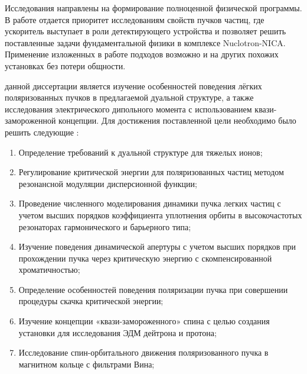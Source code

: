 \par Исследования направлены на формирование полноценной физической программы. В работе отдается приоритет исследованиям свойств пучков частиц, где ускоритель выступает в роли детектирующего устройства и позволяет решить поставленные задачи фундаментальной физики в комплексе Nuclotron-NICA. Применение изложенных в работе подходов возможно и на других похожих установках без потери общности.
~\\
\par {\aim} данной диссертации является изучение особенностей поведения лёгких поляризованных пучков в предлагаемой дуальной структуре, а также исследования электрического дипольного момента с использованием квази-замороженной концепции.
Для достижения поставленной цели необходимо было 
решить следующие {\tasks}:
\begin{enumerate}[beginpenalty=10000] %
	\item	Определение требований к дуальной структуре для тяжелых ионов;
	\item	Регулирование критической энергии для поляризованных частиц методом резонансной модуляции дисперсионной функции;
	\item	Проведение численного моделирования динамики пучка легких частиц с учетом высших порядков коэффициента уплотнения орбиты в высокочастотых резонаторах гармонического и барьерного типа;
	\item 	Изучение поведения динамической апертуры с учетом высших порядков при прохождении пучка через критическую энергию с скомпенсированной хроматичностью;
	\item 	Определение особенностей поведения поляризации пучка при совершении процедуры скачка критической энергии;
	\item 	Изучение концепции «квази-замороженного» спина с целью создания установки для исследования ЭДМ дейтрона и протона;
	\item	Исследование спин-орбитального движения поляризованного пучка в магнитном кольце с фильтрами Вина;
\end{enumerate}
~\\
\par {\novelty}
